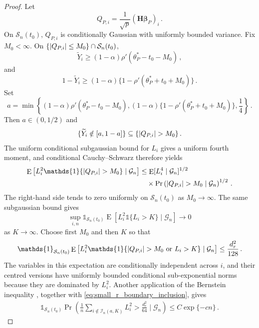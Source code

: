 \documentclass{article}
\makeatletter
\DeclareMathOperator{\expect}{E}
\theoremstyle{definition}
\newcommand{\abs}[1]{%
	\ensuremath{%
		\if@display
		\left| #1 \right|
		\else
		\lvert #1 \rvert
		\fi
	}%
}
\newcommand*{\bb}{\boldsymbol}
\def\bH {\bb{H}}
\def\Ytil{\widetilde{Y}}
\def\bbeta{\bb{\beta}}
\def\bH{\bb{H}}
\makeatother
\begin{document}
\begin{bibunit}
\begin{proof}
Let
$$
	Q_{P,i}
	=
	\frac1{\sqrt p}(\bH\bbeta_P)_i\,.
$$
On $\mathcal S_n(t_0)$, $Q_{P,i}$ is conditionally Gaussian with uniformly
bounded variance. Fix $M_0<\infty$. On
$\{\abs{Q_{P,i}}\leq M_0\}\cap\mathcal S_n(t_0)$,
$$
	\Ytil_i
	\geq
	(1-\alpha)\rho'(\theta_P^*-t_0-M_0) \,,
$$
and
$$
	1-\Ytil_i
	\geq
	(1-\alpha)
	\{1-\rho'(\theta_P^*+t_0+M_0)\}\,.
$$
Set
$$
	a
	=
	\min\left\{
		(1-\alpha)\rho'(\theta_P^*-t_0-M_0),
		(1-\alpha)
		\{1-\rho'(\theta_P^*+t_0+M_0)\},
		\frac14
	\right\}\,.
$$
Then $a\in(0,1/2)$ and
\begin{equation}
\label{eq:small_r_boundary_inclusion}
	\{\Ytil_i\notin[a,1-a]\}
	\subseteq
	\{\abs{Q_{P,i}}>M_0\}\,.
\end{equation}
The uniform conditional subgaussian bound for $L_i$ gives a uniform fourth
moment, and conditional Cauchy--Schwarz therefore yields
$$
\begin{aligned}
	\expect\left[
		L_i^2\mathds{1}\{\abs{Q_{P,i}}>M_0\}
		\mid
		\mathcal G_n
	\right]
	&\leq
	\expect[
		L_i^4
		\mid
		\mathcal G_n
	]^{1/2}
	\\
	&\quad\times
	\Pr\left(
		\abs{Q_{P,i}}>M_0
		\mid
		\mathcal G_n
	\right)^{1/2}\,.
\end{aligned}
$$
The right-hand side tends to zero uniformly on $\mathcal S_n(t_0)$ as
$M_0\to\infty$. The same subgaussian bound gives
$$
	\underset{i,n}{\sup}
	\mathds{1}_{\mathcal S_n(t_0)}
	\expect\left[
		L_i^2\mathds{1}\{L_i>K\}
		\mid
		\mathcal G_n
	\right]
	\longrightarrow
	0
$$
as $K\to\infty$. Choose first $M_0$ and then $K$ so that
$$
	\mathds{1}_{\mathcal S_n(t_0)}
	\expect\left[
		L_i^2
		\mathds{1}
		\{\abs{Q_{P,i}}>M_0\ \text{or}\ L_i>K\}
		\mid
		\mathcal G_n
	\right]
	\leq
	\frac{d_r^2}{128}\,.
$$
The variables in this expectation are conditionally independent across
$i$, and their centred versions have uniformly bounded conditional
sub-exponential norms because they are dominated by $L_i^2$. Another
application of the Bernstein inequality \citep[Theorem~2.8.1]{vershynin:2018}, together with
\eqref{eq:small_r_boundary_inclusion}, gives
\begin{equation}
\label{eq:small_r_exceptional_energy_probability}
\begin{aligned}
	\mathds{1}_{\mathcal S_n(t_0)}
	\Pr\left(
		\frac1n
		\sum_{i\notin\mathcal I_n(a,K)}L_i^2
		>
		\frac{d_r^2}{64}
		\mid
		\mathcal G_n
	\right)
	\leq
	C\exp\{-cn\}\,.
\end{aligned}
\end{equation}


\end{proof}
\end{bibunit}
\end{document}
